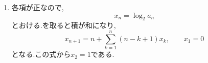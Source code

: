 \begin{enumerate}[label=\textbf{問\arabic*.},leftmargin=3.8em,format=\bookitemlink{practice-advanced}{solution}{problem}]
                $1$を引き,逆数を取り,一次式を加えることで,順に等比型へ帰着させた.

                \noindent \textbf{【別解】}\\
                $b_n$の式を$2^n$で割ると,
                \[
                 \frac{b_{n+1}}{2^n}
                  -\frac{b_n}{2^{n-1}}=\frac{n}{2^n}.
                \]
                したがって
                \[
                 \frac{b_n}{2^{n-1}}
                 =1+\sum_{k=1}^{n-1}\frac{k}{2^k}.
                \]
                ここで
                \[
                 \frac{k}{2^k}
                 =\frac{k+1}{2^{k-1}}-\frac{k+2}{2^k}
                \]
                だから総和は相殺し,
                \[
                 \sum_{k=1}^{n-1}\frac{k}{2^k}
                  =2-\frac{n+1}{2^{n-1}}.
                \]
                これから同じ$b_n$を得る.一次式を加える解法は,この相殺をの形で先に組み込んだものといえる.
          \item 各項が正なので,
                \[
                  x_n=\log_2a_n
                \]
                とおける.を取ると積が和になり,
                \[
                  x_{n+1}
                   =n+\sum_{k=1}^{n}(n-k+1)x_k,
                  \qquad x_1=0
                \]
                となる.この式から$x_2=1$である.


\end{enumerate}
